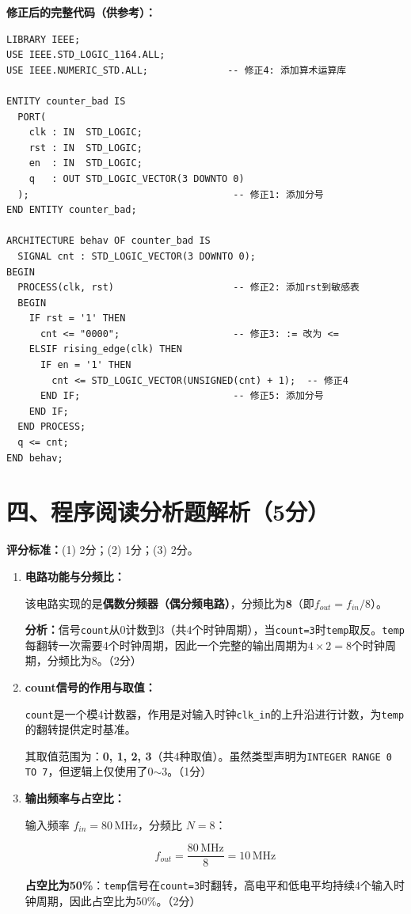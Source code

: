 \begin{framed}
\textbf{修正后的完整代码（供参考）：}
\begin{lstlisting}[language=VDL]
LIBRARY IEEE;
USE IEEE.STD_LOGIC_1164.ALL;
USE IEEE.NUMERIC_STD.ALL;              -- 修正4: 添加算术运算库

ENTITY counter_bad IS
  PORT(
    clk : IN  STD_LOGIC;
    rst : IN  STD_LOGIC;
    en  : IN  STD_LOGIC;
    q   : OUT STD_LOGIC_VECTOR(3 DOWNTO 0)
  );                                    -- 修正1: 添加分号
END ENTITY counter_bad;

ARCHITECTURE behav OF counter_bad IS
  SIGNAL cnt : STD_LOGIC_VECTOR(3 DOWNTO 0);
BEGIN
  PROCESS(clk, rst)                     -- 修正2: 添加rst到敏感表
  BEGIN
    IF rst = '1' THEN
      cnt <= "0000";                    -- 修正3: := 改为 <=
    ELSIF rising_edge(clk) THEN
      IF en = '1' THEN
        cnt <= STD_LOGIC_VECTOR(UNSIGNED(cnt) + 1);  -- 修正4
      END IF;                           -- 修正5: 添加分号
    END IF;
  END PROCESS;
  q <= cnt;
END behav;
\end{lstlisting}
\end{framed}

\section{四、程序阅读分析题解析（5分）}

\begin{framed}
\textbf{评分标准：}(1) 2分；(2) 1分；(3) 2分。
\end{framed}

\begin{enumerate}[label=(\arabic*)]

\item \textbf{电路功能与分频比：}

该电路实现的是\textbf{偶数分频器（偶分频电路）}，分频比为\textbf{8}（即$f_{out} = f_{in}/8$）。

\textbf{分析：}信号\texttt{count}从0计数到3（共4个时钟周期），当\texttt{count=3}时\texttt{temp}取反。\texttt{temp}每翻转一次需要4个时钟周期，因此一个完整的输出周期为$4\times 2 = 8$个时钟周期，分频比为8。（2分）

\item \textbf{count信号的作用与取值：}

\texttt{count}是一个模4计数器，作用是对输入时钟\texttt{clk\_in}的上升沿进行计数，为\texttt{temp}的翻转提供定时基准。

其取值范围为：\textbf{0, 1, 2, 3}（共4种取值）。虽然类型声明为\texttt{INTEGER RANGE 0 TO 7}，但逻辑上仅使用了0$\sim$3。（1分）

\item \textbf{输出频率与占空比：}

输入频率 $f_{in} = 80\,\text{MHz}$，分频比 $N = 8$：

$$f_{out} = \frac{80\,\text{MHz}}{8} = 10\,\text{MHz}$$

\textbf{占空比为50\%}：\texttt{temp}信号在\texttt{count=3}时翻转，高电平和低电平均持续4个输入时钟周期，因此占空比为50\%。（2分）

\end{enumerate}

